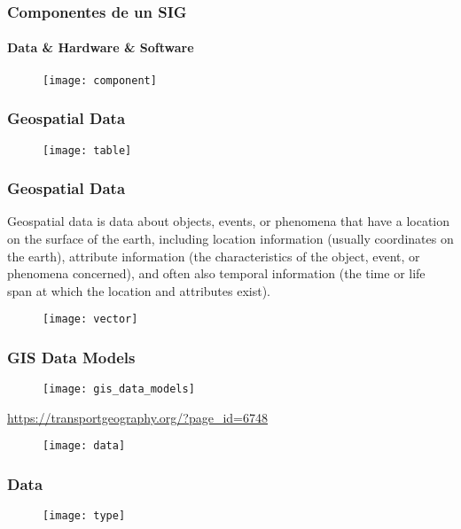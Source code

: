 \documentclass[14pt]{beamer}
\begin{document}
\begin{frame}
\frametitle{Componentes de un SIG}
\framesubtitle{Data \& Hardware \& Software}
  \begin{figure}
    \centering
    \texttt{[image: component]}
  \end{figure}
\end{frame}
\begin{frame}
\frametitle{Geospatial Data}
  \begin{figure}
    \centering
    \texttt{[image: table]}
  \end{figure}
\end{frame}
\begin{frame}
\frametitle{Geospatial Data}
\scriptsize{Geospatial data is data about objects, events, or phenomena that have a location on the surface of the earth, including location information (usually coordinates on the earth), attribute information (the characteristics of the object, event, or phenomena concerned), and often also temporal information (the time or life span at which the location and attributes exist).}
  \begin{figure}
    \centering
    \texttt{[image: vector]}
  \end{figure}
\end{frame}
\begin{frame}
\frametitle{GIS Data Models}
  \begin{figure}
    \centering
    \texttt{[image: gis\_data\_models]}
  \end{figure}
  \tiny{\url{https://transportgeography.org/?page_id=6748}}
\end{frame}
\begin{frame}
  \begin{figure}
    \centering
    \texttt{[image: data]}
  \end{figure}
\end{frame}
\begin{frame}
\frametitle{Data}
  \begin{figure}
    \centering
    \texttt{[image: type]}
  \end{figure}
\end{frame}
\end{document}
